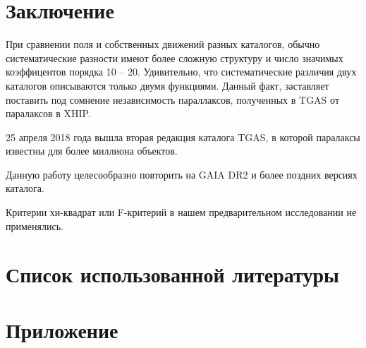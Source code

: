 \documentclass[14pt]{article} %
\begin{document}
\section{Заключение}\label{conclusion}
При сравнении поля и собственных движений разных каталогов, обычно систематические разности имеют более сложную структуру и число значимых коэффицентов порядка 10 -- 20. Удивительно, что систематические различия двух каталогов описываются только двумя функциями. Данный факт, заставляет поставить под сомнение независимость параллаксов, полученных в TGAS от паралаксов в XHIP.

25 апреля 2018 года вышла вторая редакция каталога TGAS, в которой паралаксы известны для более миллиона объектов.

Данную работу целесообразно повторить на GAIA DR2 и более поздних версиях каталога.

Критерии хи-квадрат или F-критерий в нашем предварительном исследовании не применялись.

\newpage
\section{Список использованной литературы}\label{conclusionlit}
%
%
\printbibliography[type=online,title={Сайты}]
\printbibliography[type=book,title={Статьи:}]


\appendix

\section*{Приложение}
\end{document}

